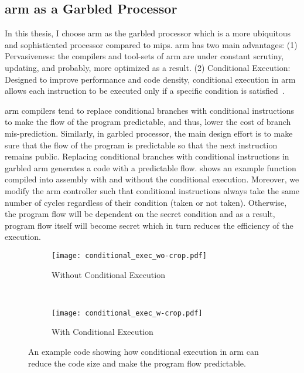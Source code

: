 \subsection{\gls{arm} as a Garbled Processor}\label{ssec:arm}
In this thesis, I choose \gls{arm} as the garbled processor which is a more ubiquitous and sophisticated processor compared to \gls{mips}.
\gls{arm} has two main advantages:
(1) Pervasiveness: the compilers and tool-sets of \gls{arm} are under constant scrutiny, updating, and probably, more optimized as a result.
(2) Conditional Execution: Designed to improve performance and code density, conditional execution in \gls{arm} allows each instruction to be executed only if a specific condition is satisfied~\cite{sloss2004arm}.

\gls{arm} compilers tend to replace conditional branches with conditional instructions to make the flow of the program predictable, and thus, lower the cost of branch mis-prediction.
Similarly, in garbled processor, the main design effort is to make sure that the flow of the program is predictable so that the next instruction remains public.
Replacing conditional branches with conditional instructions in garbled \gls{arm} generates a code with a predictable flow.
 shows an example function compiled into assembly with and without the conditional execution.
Moreover, we modify the \gls{arm} controller such that conditional instructions always take the same number of cycles regardless of their condition (taken or not taken).
Otherwise, the program flow will be dependent on the secret condition and as a result, program flow itself will become secret which in turn reduces the efficiency of the execution.

\begin{figure}
    \centering
    \begin{subfigure}{0.40\columnwidth}
        \centering
        \texttt{[image: conditional\_exec\_wo-crop.pdf]}
        \caption{Without Conditional Execution}
    \end{subfigure}
    ~
    \begin{subfigure}{0.40\columnwidth}
        \centering
        \texttt{[image: conditional\_exec\_w-crop.pdf]}
        \caption{With Conditional Execution}
    \end{subfigure}
    \caption{An example code showing how conditional execution in \gls{arm} can reduce the code size and make the program flow predictable.}\label{fig:conditional_exec}
\end{figure}

